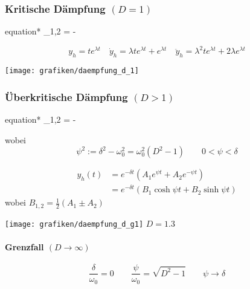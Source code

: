 \documentclass[9pt,fleqn,ngerman,article]{memoir}
\begin{document}
\begin{multicols*}{3}
				\subsubsection{Kritische Dämpfung $(D = 1)$} %
					
					\begin{empheq}[box=\shadowbox*]{equation*}
						\lambda_{1,2} = - \delta
					\end{empheq}
					
					\[
						y_h = t e^{\lambda t}
						\quad
						\dot{y}_h = \lambda t e^{\lambda t} + e^{\lambda t}
						\quad
						\ddot{y}_h = \lambda^2 t e^{\lambda t} + 2 \lambda e^{\lambda t}
					\]
					
					\begin{center}
						\texttt{[image: grafiken/daempfung\_d\_1]}
					\end{center}
				
				\subsubsection{Überkritische Dämpfung $(D > 1)$} %
					
					\begin{empheq}[box=\shadowbox*]{equation*}
						\lambda_{1,2} = - \delta \pm \psi
					\end{empheq}
					wobei
					\[
						\psi^2 := \delta^2 - \omega_0^2 = \omega_0^2 (D^2 - 1) \qquad 0 < \psi < \delta
					\]
					
					\begin{align*}
						y_h(t) &= e^{-\delta t} (A_1 e^{\psi t} + A_2 e^{-\psi t}) \\
						&= e^{-\delta t} (B_1 \cosh \psi t + B_2 \sinh \psi t)
					\end{align*}
					wobei $B_{1,2} = \frac{1}{2}(A_1 \pm A_2)$
					
					\begin{center}
						\texttt{[image: grafiken/daempfung\_d\_g1]}
						$D = 1.3$
					\end{center}
					
					\paragraph{Grenzfall $(D \to \infty)$} %
						
						\[
							\frac{\delta}{\omega_0} = 0 \qquad \frac{\psi}{\omega_0} = \sqrt{D^2 - 1} \qquad \psi \to \delta
						\]
						

\end{multicols*}
\end{document}
